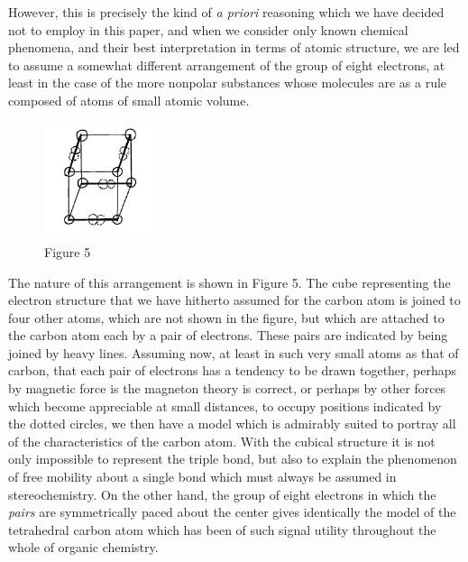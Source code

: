 \documentclass[11pt]{memoir}
\begin{document}
However, this is precisely the kind of \emph{a priori} reasoning which we have decided not to employ in this paper, and when we consider only known chemical phenomena, and their best interpretation in terms of atomic structure, we are led to assume a somewhat different arrangement of the group of eight electrons, at least in the case of the more nonpolar substances whose molecules are as a rule composed of atoms of small atomic volume.


\begin{figure}
	\begin{center}
		\includegraphics[width=0.3\textwidth]{images/lewis_figure5.png}
	\end{center}
	\caption*{Figure 5}


\end{figure}


The nature of this arrangement is shown in Figure 5.  The cube representing the electron structure that we have hitherto assumed for the carbon atom is joined to four other atoms, which are not shown in the figure, but which are attached to the carbon atom each by a pair of electrons.  These pairs are indicated by being joined by heavy lines.  Assuming now, at least in such very small atoms as that of carbon, that each pair of electrons has a tendency to be drawn together, perhaps by magnetic force is the magneton theory is correct, or perhaps by other forces which become appreciable at small distances, to occupy positions indicated by the dotted circles, we then have a model which is admirably suited to portray all of the characteristics of the carbon atom.  With the cubical structure it is not only impossible to represent the triple bond, but also to explain the phenomenon of free mobility about a single bond which must always be assumed in stereochemistry.  On the other hand, the group of eight electrons in which the \emph{pairs} are symmetrically paced about the center gives identically the model of the tetrahedral carbon atom which has been of such signal utility throughout the whole of organic chemistry.
\end{document}
